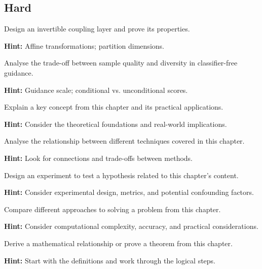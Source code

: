 \subsection*{Hard}

\begin{problem}
Design an invertible coupling layer and prove its properties.

\textbf{Hint:} Affine transformations; partition dimensions.
\end{problem}

\begin{problem}
Analyse the trade-off between sample quality and diversity in classifier-free guidance.

\textbf{Hint:} Guidance scale; conditional vs. unconditional scores.
\end{problem}


\begin{problem}
Explain a key concept from this chapter and its practical applications.

\textbf{Hint:} Consider the theoretical foundations and real-world implications.
\end{problem}

\begin{problem}
Analyse the relationship between different techniques covered in this chapter.

\textbf{Hint:} Look for connections and trade-offs between methods.
\end{problem}

\begin{problem}
Design an experiment to test a hypothesis related to this chapter's content.

\textbf{Hint:} Consider experimental design, metrics, and potential confounding factors.
\end{problem}

\begin{problem}
Compare different approaches to solving a problem from this chapter.

\textbf{Hint:} Consider computational complexity, accuracy, and practical considerations.
\end{problem}

\begin{problem}
Derive a mathematical relationship or prove a theorem from this chapter.

\textbf{Hint:} Start with the definitions and work through the logical steps.
\end{problem}


